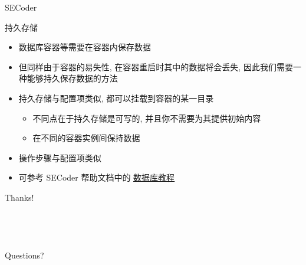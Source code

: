 \documentclass{beamer}
\begin{document}
\begin{frame}{SECoder}
    \begin{block}{持久存储}
        \begin{itemize}
            \item 数据库容器等需要在容器内保存数据
            \item 但同样由于容器的易失性, 在容器重启时其中的数据将会丢失, 因此我们需要一种能够持久保存数据的方法
            \item 持久存储与配置项类似, 都可以挂载到容器的某一目录
            \begin{itemize}\item 不同点在于持久存储是可写的, 并且你不需要为其提供初始内容
            \item 在不同的容器实例间保持数据
            \end{itemize}
            \item 操作步骤与配置项类似
            \item 可参考 SECoder 帮助文档中的  \href{https://docs.secoder.net/service/deployer/tutorial-database/}{\underline{数据库教程}}
        \end{itemize}
    \end{block}
\end{frame}

\begin{frame}
    \begin{center}
        {\Huge\calligra Thanks!} ~\\ ~\\ ~\\
        ~\\
        ~\\
        Questions?
    \end{center}
\end{frame}
\end{document}
